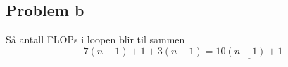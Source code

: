 \documentclass[english,notitlepage]{revtex4-1}  %
\begin{document}
\subsection*{Problem b}
Så antall FLOPs i loopen blir til sammen 
$$7(n-1)+1+3(n-1)=\underline{\underline{10(n-1)+1}}
$$

\end{document}
